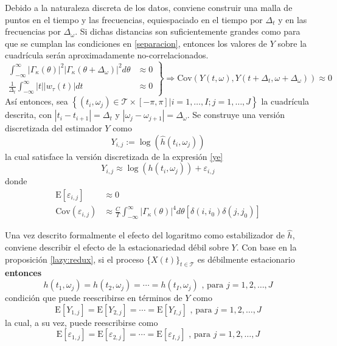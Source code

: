 \documentclass[12pt,letterpaper]{book}
\newcommand{\intR}{\int_{-\infty}^{\infty}}
\newcommand{\E}[1]{\mathrm{E}\left[ #1 \right]}
\newcommand{\Cov}[1]{\mathrm{Cov}\left( #1 \right)}
\newcommand{\abso}[1]{\left| #1 \right|}
\newcommand{\xt}{$\{X(t)\}_{t\in \mathcal{T}}$ }
\begin{document}
Debido a la naturaleza discreta de los datos, conviene construir una malla de puntos en el tiempo y las frecuencias, equiespaciado en el tiempo por $\Delta_t$ y en las frecuencias por $\Delta_\omega$.
%
Si dichas distancias son suficientemente grandes como para que se cumplan las condiciones en \ref{separacion}, entonces los valores de $Y$ sobre la cuadrícula serán aproximadamente no-correlacionados.
%
\begin{equation}
\left.
\begin{aligned}
\intR \abso{\Gamma_\kappa(\theta)}^{2}\abso{\Gamma_\kappa(\theta+\Delta_\omega)}^{2} d\theta 
&\approx 0 \\
\frac{1}{\Delta_t} \intR \abso{t} \abso{w_\tau (t)} dt &\approx 0
\end{aligned}
\right\rbrace
\Rightarrow
\Cov{Y(t,\omega),Y(t+\Delta_t,\omega+\Delta_\omega)} \approx 0
\label{separacion}
\end{equation}
%
Así entonces, sea
$\left\{ (t_i,\omega_j) \in \mathcal{T} \times [-\pi,\pi] | i = 1,\dots,I ; j=1,\dots,J \right\}$
la cuadrícula descrita, con $\abso{t_i - t_{i+1}}= \Delta_t$ y 
$\abso{\omega_j-\omega_{j+1}}= \Delta_\omega$. 
%
Se construye una versión discretizada del estimador $Y$ como
\begin{equation}
Y_{i,j} := \log\left(\widehat{h}(t_i,\omega_j)\right)
\end{equation}
%
la cual satisface la versión discretizada de la expresión \ref{ye} 
\begin{equation}
Y_{i,j} \approx \log\left(h(t_i,\omega_j)\right) + \varepsilon_{i,j}
\label{def:ye}
\end{equation}
donde
\begin{align}
\E{\varepsilon_{i,j}} &\approx 0 \\
\Cov{\varepsilon_{i,j}} &\approx
\frac{C}{T} \intR \abso{\Gamma_\kappa(\theta)}^{4} d\theta \left[ \delta(i,i_0)\delta(j,j_0) \right]
\end{align}

Una vez descrito formalmente el efecto del logaritmo como estabilizador de $\widehat{h}$,
conviene describir el efecto de la estacionariedad débil sobre $Y$.
%
Con base en la proposición \ref{lazy:redux}, si el proceso \xt es débilmente estacionario \textbf{entonces}
%
\begin{equation}
h(t_1,\omega_j) = h(t_2,\omega_j) = \cdots = h(t_I,\omega_j) \text{ , para } j = 1, 2, \dots , J
\label{h1}
\end{equation}
condición que puede reescribirse en términos de $Y$ como
%
\begin{equation}
\E{Y_{1,j}} = \E{Y_{2,j}} = \cdots = \E{Y_{I,j}} \text{ , para } j = 1, 2, \dots , J
\label{h2}
\end{equation}
%
la cual, a su vez, puede reescribirse como
\begin{equation}
\E{\varepsilon_{1,j}} = \E{\varepsilon_{2,j}} = \cdots = \E{\varepsilon_{I,j}} \text{ , para } j = 1, 2, \dots , J
\label{h3}
\end{equation}
\end{document}
